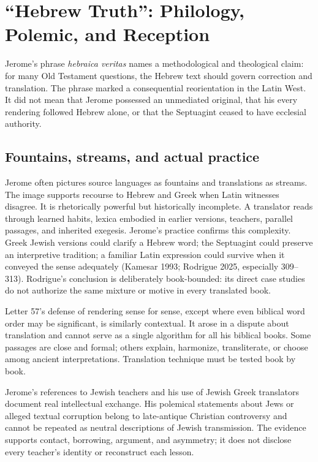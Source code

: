 \section{``Hebrew Truth'': Philology, Polemic, and Reception}

Jerome's phrase \emph{hebraica veritas} names a methodological and theological claim: for many Old Testament questions, the Hebrew text should govern correction and translation. The phrase marked a consequential reorientation in the Latin West. It did not mean that Jerome possessed an unmediated original, that his every rendering followed Hebrew alone, or that the Septuagint ceased to have ecclesial authority.

\subsection{Fountains, streams, and actual practice}

Jerome often pictures source languages as fountains and translations as streams. The image supports recourse to Hebrew and Greek when Latin witnesses disagree. It is rhetorically powerful but historically incomplete. A translator reads through learned habits, lexica embodied in earlier versions, teachers, parallel passages, and inherited exegesis. Jerome's practice confirms this complexity. Greek Jewish versions could clarify a Hebrew word; the Septuagint could preserve an interpretive tradition; a familiar Latin expression could survive when it conveyed the sense adequately (Kamesar 1993; Rodrigue 2025, especially 309--313). Rodrigue's conclusion is deliberately book-bounded: its direct case studies do not authorize the same mixture or motive in every translated book.

Letter 57's defense of rendering sense for sense, except where even biblical word order may be significant, is similarly contextual. It arose in a dispute about translation and cannot serve as a single algorithm for all his biblical books. Some passages are close and formal; others explain, harmonize, transliterate, or choose among ancient interpretations. Translation technique must be tested book by book.

Jerome's references to Jewish teachers and his use of Jewish Greek translators document real intellectual exchange. His polemical statements about Jews or alleged textual corruption belong to late-antique Christian controversy and cannot be repeated as neutral descriptions of Jewish transmission. The evidence supports contact, borrowing, argument, and asymmetry; it does not disclose every teacher's identity or reconstruct each lesson.

